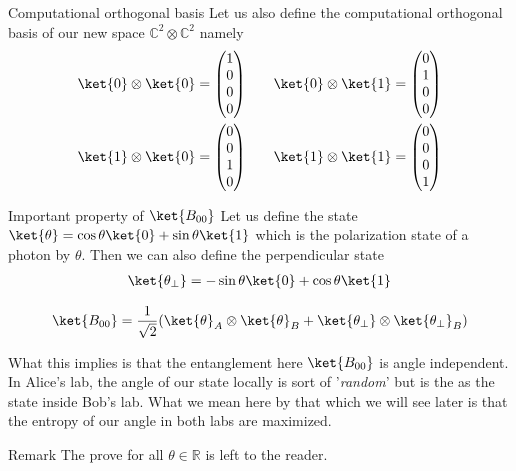 \begin{parag}{Computational orthogonal basis}
    Let us also define the computational orthogonal basis of our new space $\mathbb{C}^2 \otimes \mathbb{C}^2$ namely 
	\begin{align*} 
		\ket{0} \otimes \ket{0} &= \begin{pmatrix} 1 \\ 0 \\ 0 \\ 0 \end{pmatrix}  \mathspace \mathspace \ket{0} \otimes \ket{1} = \begin{pmatrix} 0 \\ 1 \\ 0 \\ 0 \end{pmatrix} \\
		\ket{1} \otimes \ket{0} &= \begin{pmatrix} 0 \\ 0 \\ 1 \\ 0 \end{pmatrix}  \mathspace \mathspace\ket{1} \otimes \ket{1} = \begin{pmatrix} 0 \\ 0 \\ 0 \\ 1 \end{pmatrix} 
	\end{align*}
\end{parag}

\begin{parag}{Important property of $\ket{B_{00}}$}
    Let us define the state $\ket{\theta} = \cos \theta \ket{0} + \sin \theta \ket{1}$ which is the polarization state of a photon by $\theta$. Then we can also define the perpendicular  state
	\begin{align*} 
		\ket{\theta_\perp} = -\sin \theta \ket{0} + \cos \theta \ket{1}
	\end{align*}
	\begin{theoreme}
	\begin{align*} 
		\ket{B_{00}}   = \frac{1}{\sqrt{2}}\left(\ket{\theta}_A \otimes \ket{\theta}_B + \ket{\theta_\perp} \otimes \ket{\theta_\perp}_B\right)
	\end{align*}
	\end{theoreme}
	What this implies is that the entanglement here $\ket{B_{00}}$ is angle independent. In Alice's lab, the angle of our state locally is sort of '\textit{random}' but is the  as the state inside Bob's lab. What we mean here by that which we will see later is that the entropy of our angle in both labs are maximized.
	\begin{subparag}{Remark}
	    The prove for all $\theta \in \mathbb{R}$ is left to the reader.
	\end{subparag}

\end{parag}



